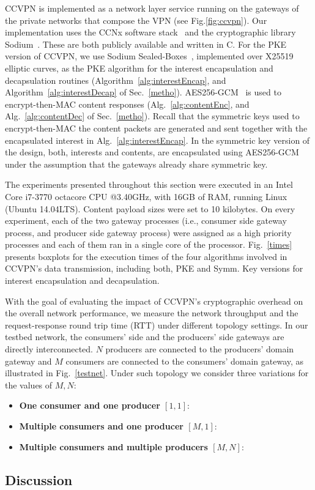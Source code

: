CCVPN is implemented as a network layer service running on the gateways of the private networks that compose the VPN (see Fig.\ref{fig:ccvpn}).
Our implementation uses the CCNx software stack~\cite{CCNxGithub} and the cryptographic library Sodium~\cite{sodiumGithub}. These are both publicly available and written in C.
For the PKE version of CCVPN, we use Sodium Sealed-Boxes~\cite{bernstein2006curve25519}, implemented over X25519 elliptic curves, as the PKE algorithm for the interest encapsulation and decapsulation routines (Algorithm~\ref{alg:interestEncap}, and Algorithm~\ref{alg:interestDecap} of Sec.~\ref{metho}).
AES256-GCM~\cite{dworkin2007recommendation} is used to encrypt-then-MAC content responses (Alg.~\ref{alg:contentEnc}, and Alg.~\ref{alg:contentDec} of Sec.~\ref{metho}).
Recall that the symmetric keys used to encrypt-then-MAC the content packets are generated and sent together with the encapsulated interest in Alg.~\ref{alg:interestEncap}.
In the symmetric key version of the design, both, interests and contents, are encapsulated using AES256-GCM under the assumption that the gateways already share symmetric key.


The experiments presented throughout this section were executed in an Intel Core i7-3770 octacore CPU @3.40GHz, with 16GB of RAM, running Linux (Ubuntu 14.04LTS). Content payload sizes were set to 10 kilobytes.
On every experiment, each of the two gateway processes (i.e., consumer side gateway process, and producer side gateway process) were assigned as a high priority processes and each of them ran in a single core of the processor.
Fig.~\ref{times} presents boxplots for the execution times of the four algorithms involved in CCVPN's data transmission, including both, PKE and Symm. Key versions for interest encapsulation and decapsulation.

With the goal of evaluating the impact of CCVPN's cryptographic overhead on the overall network performance, we measure the network throughput and the request-response round trip time (RTT) under different topology settings.
In our testbed network, the consumers' side and the producers' side gateways are directly interconnected. $N$ producers are connected to the producers' domain gateway and $M$ consumers are connected to the consumers' domain gateway, as illustrated in Fig.~\ref{testnet}.
Under such topology we consider three variations for the values of ${M,N}$:

\begin{itemize}
 \item \textbf{One consumer and one producer $[1,1]$}:
 \item \textbf{Multiple consumers and one producer $[M,1]$}:
 \item \textbf{Multiple consumers and multiple producers $[M,N]$}:
\end{itemize}

\subsection{Discussion}


